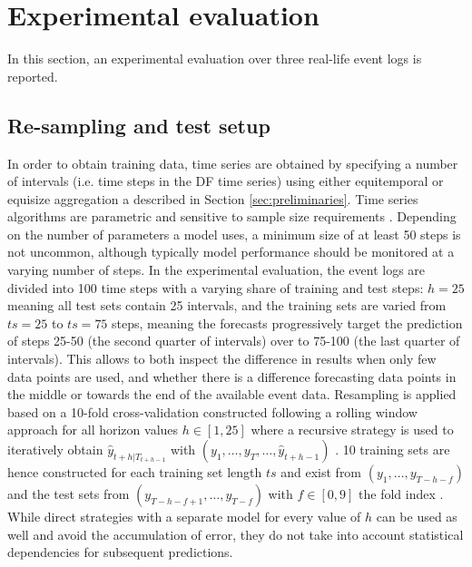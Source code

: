 \section{Experimental evaluation}\label{sec:experiment}
In this section, an experimental evaluation over three real-life event logs is reported.


\subsection{Re-sampling and test setup}
In order to obtain training data, time series are obtained by specifying a number of intervals (i.e. time steps in the DF time series) using either equitemporal or equisize aggregation a described in Section \ref{sec:preliminaries}.
Time series algorithms are parametric and sensitive to sample size requirements \cite{hanke2001business}.
Depending on the number of parameters a model uses, a minimum size of at least 50 steps is not uncommon, although typically model performance should be monitored at a varying number of steps.
In the experimental evaluation, the event logs are divided into 100 time steps with a varying share of training and test steps: $h=25$ meaning all test sets contain 25 intervals, and the training sets are varied from $ts=25$ to $ts=75$ steps, meaning the forecasts progressively target the prediction of steps 25-50 (the second quarter of intervals) over to 75-100 (the last quarter of intervals).
This allows to both inspect the difference in results when only few data points are used, and whether there is a difference forecasting data points in the middle or towards the end of the available event data.
Resampling is applied based on a 10-fold cross-validation constructed following a rolling window approach for all horizon values $h\in[1,25]$ where a recursive strategy is used to iteratively obtain $\hat{y}_{t+h|T_{t+h-1}}$ with $(y_1,\dots,y_{T},\dots,\hat{y}_{t+h-1})$ \cite{weigend2018time}.
10 training sets are hence constructed for each training set length $ts$ and exist from $(y_1,\dots,y_{T-h-f})$ and the test sets from $(y_{T-h-f+1},\dots,y_{T-f})$ with $f\in[0,9]$ the fold index \cite{bergmeir2012use}.
While direct strategies with a separate model for every value of $h$ can be used as well and avoid the accumulation of error, they do not take into account statistical dependencies for subsequent predictions.


